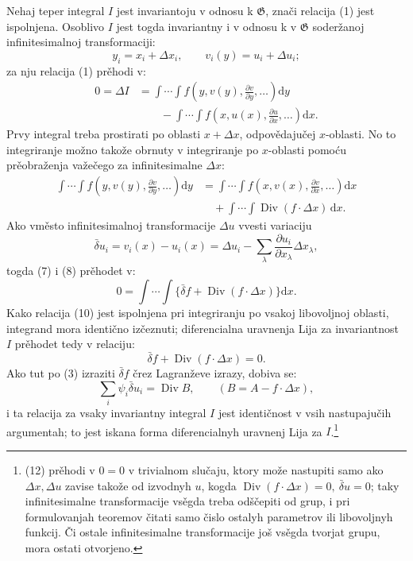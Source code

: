\documentclass[11pt]{article}
\providecommand{\G}{\mathfrak G}
\providecommand{\D}{\Delta}
\providecommand{\p}{\partial}
\providecommand{\dd}{\mathrm d}
\DeclareMathOperator{\Div}{Div}
\providecommand{\bd}{\bar{\delta}}
\begin{document}
Nehaj teper integral \(I\) jest invariantoju v odnosu k \(\G\), znači relacija (1) jest ispolnjena. Osoblivo \(I\) jest togda invariantny i v odnosu k v \(\G\) soderžanoj infinitesimalnoj transformaciji:
\[
y_i=x_i+\D x_i,\qquad v_i(y)=u_i+\D u_i;
\]
za nju relacija (1) prěhodi v:
\begin{equation}
\begin{aligned}
0=\D I
&=\int\!\cdots\!\int f\!\left(y,v(y),\frac{\p v}{\p y},\ldots\right)\dd y\\
&\qquad-\int\!\cdots\!\int f\!\left(x,u(x),\frac{\p u}{\p x},\ldots\right)\dd x.
\end{aligned}
\tag{7}
\end{equation}
Prvy integral treba prostirati po oblasti \(x+\D x\), odpovědajučej \(x\)-oblasti. No to integriranje možno takože obrnuty v integriranje po \(x\)-oblasti pomoću prěobraženja važečego za infinitesimalne \(\D x\):
\begin{equation}
\begin{aligned}
\int\!\cdots\!\int f\!\left(y,v(y),\frac{\p v}{\p y},\ldots\right)\dd y
&=\int\!\cdots\!\int f\!\left(x,v(x),\frac{\p v}{\p x},\ldots\right)\dd x\\
&\quad+\int\!\cdots\!\int \Div(f\cdot \D x)\,\dd x.
\end{aligned}
\tag{8}
\end{equation}
Ako vměsto infinitesimalnoj transformacije \(\D u\) vvesti variaciju
\begin{equation}
\bd u_i=v_i(x)-u_i(x)=\D u_i-\sum_\lambda\frac{\p u_i}{\p x_\lambda}\D x_\lambda,
\tag{9}
\end{equation}
togda (7) i (8) prěhodet v:
\begin{equation}
0=\int\!\cdots\!\int\{\bd f+\Div(f\cdot\D x)\}\dd x.
\tag{10}
\end{equation}
Kako relacija (10) jest ispolnjena pri integriranju po vsakoj libovoljnoj oblasti, integrand mora identično izčeznuti; diferencialna uravnenja Lija za invariantnost \(I\) prěhodet tedy v relaciju:
\begin{equation}
\bd f+\Div(f\cdot\D x)=0.
\tag{11}
\end{equation}
Ako tut po (3) izraziti \(\bd f\) črez Lagranževe izrazy, dobiva se:
\begin{equation}
\sum_i\psi_i\bd u_i=\Div B,\qquad (B=A-f\cdot\D x),
\tag{12}
\end{equation}
i ta relacija za vsaky invariantny integral \(I\) jest identičnost v vsih nastupajučih argumentah; to jest iskana forma diferencialnyh uravnenj Lija za \(I\).\footnote{(12) prěhodi v \(0=0\) v trivialnom slučaju, ktory može nastupiti samo ako \(\D x,\D u\) zavise takože od izvodnyh \(u\), kogda \(\Div(f\cdot\D x)=0,\ \bd u=0\); taky infinitesimalne transformacije vsěgda treba odščepiti od grup, i pri formulovanjah teoremov čitati samo čislo ostalyh parametrov ili libovoljnyh funkcij. Či ostale infinitesimalne transformacije još vsěgda tvorjat grupu, mora ostati otvorjeno.}
\end{document}
